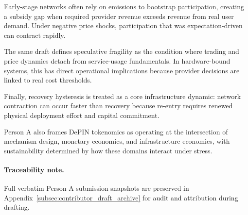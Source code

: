 Early-stage networks often rely on emissions to bootstrap participation, creating a subsidy gap when required provider revenue exceeds revenue from real user demand. Under negative price shocks, participation that was expectation-driven can contract rapidly.

The same draft defines speculative fragility as the condition where trading and price dynamics detach from service-usage fundamentals. In hardware-bound systems, this has direct operational implications because provider decisions are linked to real cost thresholds.

Finally, recovery hysteresis is treated as a core infrastructure dynamic: network contraction can occur faster than recovery because re-entry requires renewed physical deployment effort and capital commitment.

Person A also frames DePIN tokenomics as operating at the intersection of mechanism design, monetary economics, and infrastructure economics, with sustainability determined by how these domains interact under stress.

\paragraph{Traceability note.} Full verbatim Person A submission snapshots are preserved in Appendix~\ref{subsec:contributor_draft_archive} for audit and attribution during drafting.
